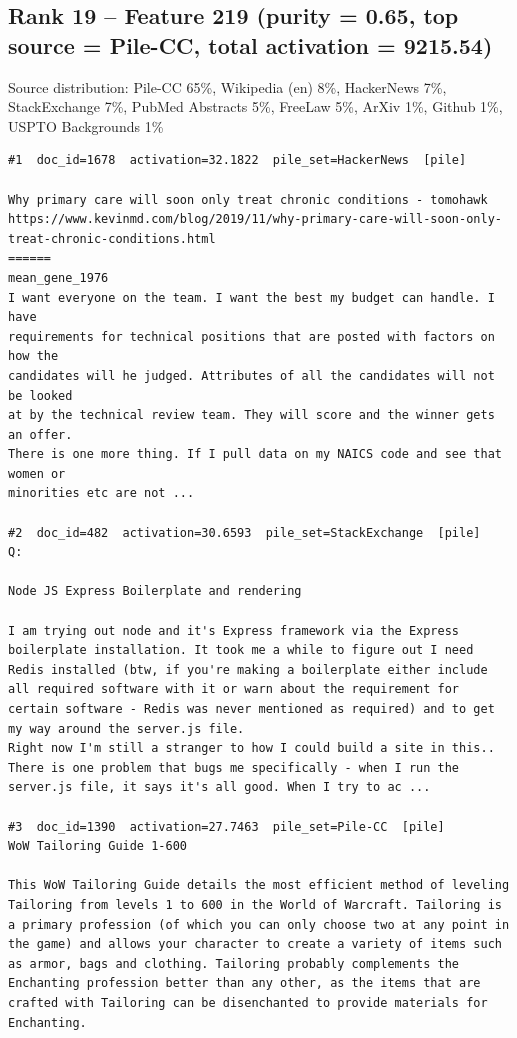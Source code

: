 \subsection*{Rank 19 -- Feature 219 (purity = 0.65, top source = Pile-CC, total activation = 9215.54)}

Source distribution: Pile-CC 65\%, Wikipedia (en) 8\%, HackerNews 7\%, StackExchange 7\%, PubMed Abstracts 5\%, FreeLaw 5\%, ArXiv 1\%, Github 1\%, USPTO Backgrounds 1\%

\begin{verbatim}
#1  doc_id=1678  activation=32.1822  pile_set=HackerNews  [pile]

Why primary care will soon only treat chronic conditions - tomohawk
https://www.kevinmd.com/blog/2019/11/why-primary-care-will-soon-only-treat-chronic-conditions.html
======
mean_gene_1976
I want everyone on the team. I want the best my budget can handle. I have
requirements for technical positions that are posted with factors on how the
candidates will he judged. Attributes of all the candidates will not be looked
at by the technical review team. They will score and the winner gets an offer.
There is one more thing. If I pull data on my NAICS code and see that women or
minorities etc are not ...

#2  doc_id=482  activation=30.6593  pile_set=StackExchange  [pile]
Q:

Node JS Express Boilerplate and rendering

I am trying out node and it's Express framework via the Express boilerplate installation. It took me a while to figure out I need Redis installed (btw, if you're making a boilerplate either include all required software with it or warn about the requirement for certain software - Redis was never mentioned as required) and to get my way around the server.js file.
Right now I'm still a stranger to how I could build a site in this..
There is one problem that bugs me specifically - when I run the server.js file, it says it's all good. When I try to ac ...

#3  doc_id=1390  activation=27.7463  pile_set=Pile-CC  [pile]
WoW Tailoring Guide 1-600

This WoW Tailoring Guide details the most efficient method of leveling Tailoring from levels 1 to 600 in the World of Warcraft. Tailoring is a primary profession (of which you can only choose two at any point in the game) and allows your character to create a variety of items such as armor, bags and clothing. Tailoring probably complements the Enchanting profession better than any other, as the items that are crafted with Tailoring can be disenchanted to provide materials for Enchanting.


\end{verbatim}
